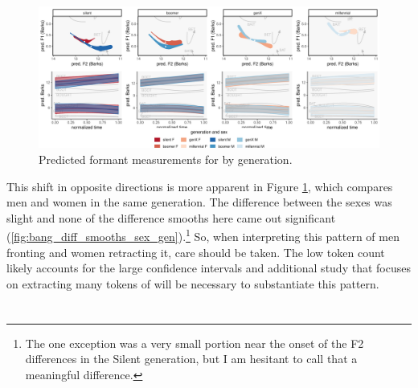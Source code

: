 \begin{figure}[p]
	\centering
	\includegraphics[angle = 90, origin = c, height = \textwidth]{Figures/BANG/BANG_sex_panel_plot_wide.pdf}
	\caption[Predicted formant measurements for \bang by generation.]{Predicted formant measurements for \bang by generation.}
	\label{fig:BANG_sex_panel_plot_wide}
\end{figure}

This shift in opposite directions is more apparent in Figure \ref{fig:BANG_sex_panel_plot_wide}, which compares men and women in the same generation. The difference between the sexes was slight and none of the difference smooths here came out significant (\ref{fig:bang_diff_smooths_sex_gen}).\footnote{The one exception was a very small portion near the onset of the F2 differences in the Silent generation, but I am hesitant to call that a meaningful difference.} So, when interpreting this pattern of men fronting \bang and women retracting it, care should be taken. The low token count likely accounts for the large confidence intervals and additional study that focuses on extracting many tokens of \bang will be necessary to substantiate this pattern.





\section{\beng}
\label{BENG}


